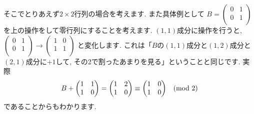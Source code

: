 \documentclass[dvipdfmx,a4paper,11pt]{article}
\newcommand{\maru}[1]{\raise0.2ex\hbox{\textcircled{\tiny{#1}}}}
\theoremstyle{definition}
\begin{document}
そこでとりあえず$2 \times 2$行列の場合を考えます.
また具体例として
$B=\begin{pmatrix}
0 & 1 \\
0 & 1 \\
 \end{pmatrix}$
 を上の操作をして零行列にすることを考えます.
 $(1,1)$成分に操作を行うと, 
 $
\begin{pmatrix}
0 & 1 \\
0 & 1 \\
 \end{pmatrix}
 \rightarrow 
 \begin{pmatrix}
1& 0 \\
1 & 1 \\
 \end{pmatrix}
 $
 と変化します.
 これは「$B$の$(1,1)$成分と$(1,2)$成分と$(2,1)$成分に$+1$して, その2で割ったあまりを見る」ということと同じです.
 実際
 $$
 B +  
 \begin{pmatrix}
1& 1 \\
1 & 0 \\
 \end{pmatrix}
 =
 \begin{pmatrix}
1& 2 \\
1 & 0 \\
 \end{pmatrix}
 \equiv
  \begin{pmatrix}
1& 0 \\
1 & 0 \\
 \end{pmatrix}
 \text{\,\,\, (mod 2)}
 $$
 であることからもわかります.
\end{document}
